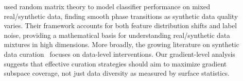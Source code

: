 \citet{el2024maximizing} used random matrix theory to model classifier performance on mixed real/synthetic data, finding smooth phase transitions as synthetic data quality varies. Their framework accounts for both feature distribution shifts and label noise, providing a mathematical basis for understanding real/synthetic data mixtures in high dimensions. More broadly, the growing literature on synthetic data curation~\citep{feng2024synthesize,seddik2025position} focuses on data-level interventions. Our gradient-level analysis suggests that effective curation strategies should aim to maximize gradient subspace coverage, not just data diversity as measured by surface statistics.
